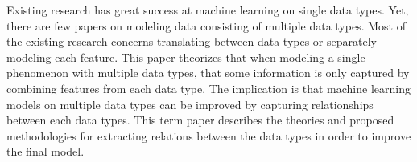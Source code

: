 
Existing research has great success at machine learning on single data types.  Yet, there are few papers on modeling data consisting of multiple data types.  Most of the existing research concerns translating between data types or separately modeling each feature.  This paper theorizes that when modeling a single phenomenon with multiple data types, that some information is only captured by combining features from each data type.  The implication is that machine learning models on multiple data types can be improved by capturing relationships between each data types.  This term paper describes the theories and proposed methodologies for extracting relations between the data types in order to improve the final model.
